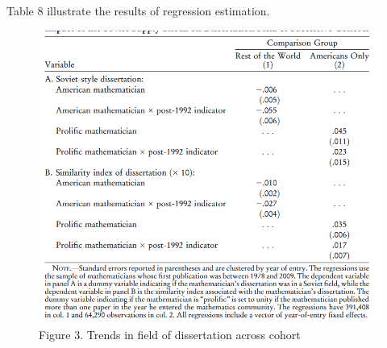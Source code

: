 \documentclass[../root]{subfiles}
\begin{document}
    Table 8 illustrate the results of regression estimation.
    \begin{figure}
        \centering
        \includegraphics[width = \linewidth]{_images/0918sugiyama/Table_8.png}
        \caption{Figure 3. Trends in field of dissertation across cohort}
        \label{fig:my_label}
    \end{figure}
    
\end{document}
